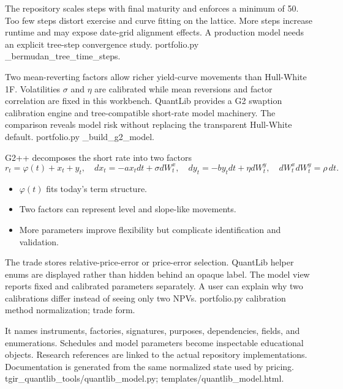 {The repository scales steps with final maturity and enforces a minimum of 50.}
{Too few steps distort exercise and curve fitting on the lattice.}
{More steps increase runtime and may expose date-grid alignment effects.}
{A production model needs an explicit tree-step convergence study.}
{portfolio.py \_bermudan\_tree\_time\_steps.}

{Two mean-reverting factors allow richer yield-curve movements than Hull-White 1F.}
{Volatilities $\sigma$ and $\eta$ are calibrated while mean reversions and factor correlation are fixed in this workbench.}
{QuantLib provides a G2 swaption calibration engine and tree-compatible short-rate model machinery.}
{The comparison reveals model risk without replacing the transparent Hull-White default.}
{portfolio.py \_build\_g2\_model.}

\begin{frame}{G2++ decomposes the short rate into two factors}
  \[
    r_t=\varphi(t)+x_t+y_t,
    \quad dx_t=-a x_tdt+\sigma dW_t^x,
    \quad dy_t=-b y_tdt+\eta dW_t^y,
    \quad dW_t^x dW_t^y=\rho\,dt.
  \]
  \begin{itemize}\setlength\itemsep{0.8em}
    \item $\varphi(t)$ fits today's term structure.
    \item Two factors can represent level and slope-like movements.
    \item More parameters improve flexibility but complicate identification and validation.
  \end{itemize}
\end{frame}

{The trade stores relative-price-error or price-error selection.}
{QuantLib helper enums are displayed rather than hidden behind an opaque label.}
{The model view reports fixed and calibrated parameters separately.}
{A user can explain why two calibrations differ instead of seeing only two NPVs.}
{portfolio.py calibration method normalization; trade form.}

{It names instruments, factories, signatures, purposes, dependencies, fields, and enumerations.}
{Schedules and model parameters become inspectable educational objects.}
{Research references are linked to the actual repository implementations.}
{Documentation is generated from the same normalized state used by pricing.}
{tgir\_quantlib\_tools/quantlib\_model.py; templates/quantlib\_model.html.}

